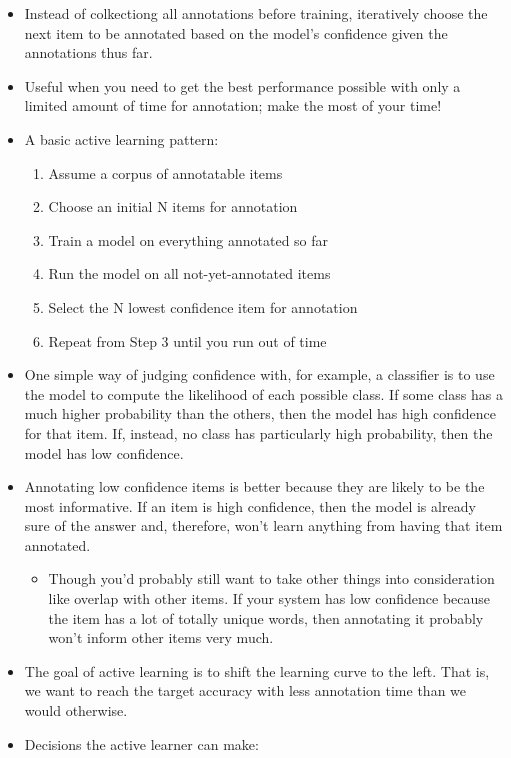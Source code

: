 \documentclass[11pt,letterpaper]{article}
\begin{document}
\begin{itemize}
  \item Instead of colkectiong all annotations before training, iteratively choose the next item to be annotated based on the model's confidence given the annotations thus far.
  \item Useful when you need to get the best performance possible with only a limited amount of time for annotation; make the most of your time!
  \item A basic active learning pattern:
    \begin{enumerate}
      \item Assume a corpus of annotatable items
      \item Choose an initial N items for annotation
      \item Train a model on everything annotated so far
      \item Run the model on all not-yet-annotated items
      \item Select the N lowest confidence item for annotation
      \item Repeat from Step 3 until you run out of time
    \end{enumerate}
  \item One simple way of judging confidence with, for example, a classifier is to use the model to compute the likelihood of each possible class.  If some class has a much higher probability than the others, then the model has high confidence for that item.  If, instead, no class has particularly high probability, then the model has low confidence.
  \item Annotating low confidence items is better because they are likely to be the most informative.  If an item is high confidence, then the model is already sure of the answer and, therefore, won't learn anything from having that item annotated.
    \begin{itemize}
      \item Though you'd probably still want to take other things into consideration like overlap with other items.  If your system has low confidence because the item has a lot of totally unique words, then annotating it probably won't inform other items very much.
    \end{itemize}
  \item The goal of active learning is to shift the learning curve to the left.  That is, we want to reach the target accuracy with less annotation time than we would otherwise.
  \item Decisions the active learner can make:

\end{itemize}
\end{document}

